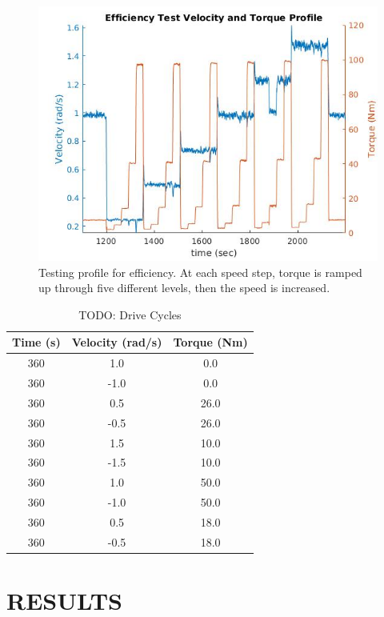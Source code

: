 \documentclass[letterpaper, 10 pt, conference]{ieeeconf}  %
\begin{document}
   \begin{figure}[!b]
      \centering
      \includegraphics[width=\linewidth]{eff_test_profile}
      \caption{Testing profile for efficiency. At each speed step, torque is ramped up through five different levels, then the speed is increased.}
      \label{eff_profile}
   \end{figure}

\begin{table}[h]
\caption{TODO: Drive Cycles}
\label{table_2}
\begin{center}
\begin{tabular}{|c||c||c|}
\hline
Time (s) & Velocity (rad/s) & Torque (Nm)\\
\hline
360 & 1.0 & 0.0\\
\hline
360 & -1.0 & 0.0\\
\hline
360 & 0.5 & 26.0\\
\hline
360 & -0.5 & 26.0\\
\hline
360 & 1.5 & 10.0\\
\hline
360 & -1.5 & 10.0\\
\hline
360 & 1.0 & 50.0\\
\hline
360 & -1.0 & 50.0\\
\hline
360 & 0.5 & 18.0\\
\hline
360 & -0.5 & 18.0\\
\hline
\end{tabular}
\end{center}
\end{table}

\section{RESULTS} \label{results}
   
\end{document}
